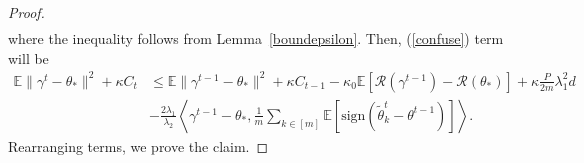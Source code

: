 \documentclass{article} %
\begin{document}
\begin{proof}
\begin{align*}
\end{align*}
where the inequality follows from Lemma~\ref{boundepsilon}. Then, (\ref{confuse}) term will be 
\begin{align*}
    \mathbb{E}\lVert \gamma^t-\theta_* \rVert^2+\kappa C_t &\le 
    \mathbb{E}\lVert \gamma^{t-1}-\theta_*\rVert^2 + \kappa C_{t-1}-\kappa_0\mathbb{E}[\mathcal{R}(\gamma^{t-1})-\mathcal{R}(\theta_*)]+\kappa\frac{P}{2m}\lambda_1^2d\\
    &-\frac{2\lambda_1}{\lambda_2 }\left\langle {\gamma^{t-1}-\theta_*}, \frac{1}{m}\sum_{k\in [m]}\mathbb{E}[\mathrm{sign}(\tilde{\theta}_k^t-\theta^{t-1})]\right\rangle.
\end{align*}
Rearranging terms, we prove the claim.
\end{proof}








 
\end{document}
